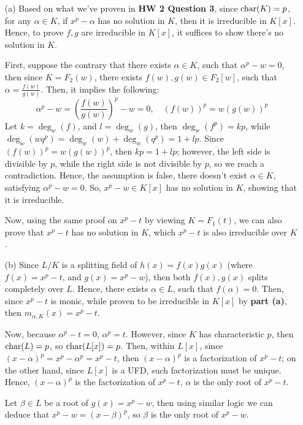 \documentclass{article}
\begin{document}
\begin{itemize}
    \item[(a)] Based on what we've proven in \textbf{HW 2 Question 3}, since $\textmd{char}(K)=p$, for any $\alpha\in K$, if $x^p-\alpha$ has no solution in $K$, then it is irreducible in $K[x]$. Hence, to prove $f,g$ are irreducible in $K[x]$, it suffices to show there's no solution in $K$.
    
    First, suppose the contrary that there exists $\alpha\in K$, such that $\alpha^p-w = 0$, then since $K=F_2(w)$, there exists $f(w),g(w)\in F_2[w]$, such that $\alpha = \frac{f(w)}{g(w)}$. Then, it implies the following:
    $$\alpha^p-w = \left(\frac{f(w)}{g(w)}\right)^p-w = 0,\quad (f(w))^p = w(g(w))^p$$
    Let $k = \deg_w(f)$, and $l=\deg_w(g)$, then $\deg_w(f^p) = kp$, while $\deg_w(wq^p) = \deg_w(w)+\deg_w(q^p) = 1+lp$. Since $(f(w))^p=w(g(w))^p$, then $kp = 1+lp$; however, the left side is divisible by $p$, while the right side is not divisible by $p$, so we reach a contradiction.
    Hence, the assumption is false, there doesn't exist $\alpha\in K$, satisfying $\alpha^p-w=0$. So, $x^p-w\in K[x]$ has no solution in $K$, showing that it is irreducible.

    Now, using the same proof on $x^p-t$ by viewing $K=F_1(t)$, we can also prove that $x^p-t$ has no solution in $K$, which $x^p-t$ is also irreducible over $K$.

    \hfil
    
    \item[(b)] Since $L/K$ is a splitting field of $h(x)=f(x)g(x)$ (where $f(x)=x^p-t$, and $g(x)=x^p-w$), then both $f(x),g(x)$ splits completely over $L$. Hence, there exists $\alpha\in L$, such that $f(\alpha)=0$. Then, since $x^p-t$ is monic, while proven to be irreducible in $K[x]$ by \textbf{part (a)}, then $m_{\alpha,K}(x) = x^p-t$.
    
    Now, because $\alpha^p-t = 0$, $\alpha^p=t$. However, since $K$ has characteristic $p$, then $\textmd{char}(L)=p$, so $\textmd{char}(L[x]) = p$. Then, within $L[x]$, since $(x-\alpha)^p = x^p-\alpha^p = x^p-t$, then $(x-\alpha)^p$ is a factorization of $x^p-t$; on the other hand, since $L[x]$ is a UFD, such factorization must be unique. Hence, $(x-\alpha)^p$ is the factorization of $x^p-t$, $\alpha$ is the only root of $x^p-t$. 

    Let $\beta\in L$ be a root of $g(x) = x^p-w$, then using similar logic we can deduce that $x^p-w = (x-\beta)^p$, so $\beta$ is the only root of $x^p-w$.


\end{itemize}
\end{document}

